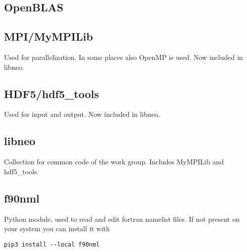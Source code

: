 \subsection{OpenBLAS}

\subsection{MPI/MyMPILib}
Used for parallelization. In some places also OpenMP is used.
Now included in libneo.

\subsection{HDF5/hdf5\_tools}
Used for input and output.
Now included in libneo.

\subsection{libneo}
Collection for common code of the work group.
Includes MyMPILib and hdf5\_tools.

\subsection{f90nml}
Python module, used to read and edit fortran namelist files.
If not present on your system you can install it with
\begin{verbatim}
pip3 install --local f90nml
\end{verbatim}
